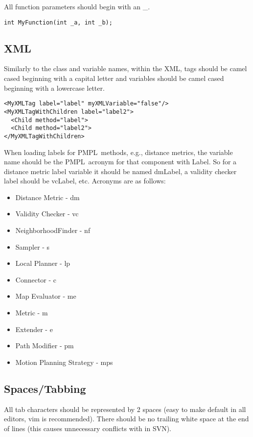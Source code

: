\documentclass[12pt]{article}
\newcommand{\pmpl}{PMPL}
\begin{document}
All function parameters should begin with an \_.

\begin{lstlisting}
int MyFunction(int _a, int _b);
\end{lstlisting}

\subsection{XML}
Similarly to the class and variable names, within the XML, tags should be camel
cased beginning with a capital letter and variables should be camel cased
beginning with a lowercase letter.

\begin{lstlisting}
<MyXMLTag label="label" myXMLVariable="false"/>
<MyXMLTagWithChildren label="label2">
  <Child method="label">
  <Child method="label2">
</MyXMLTagWithChildren>
\end{lstlisting}

When loading labels for \pmpl\ methods, e.g., distance metrics, the variable
name should be the \pmpl\ acronym for that component with Label. So for a
distance metric label variable it should be named dmLabel, a validity checker
label should be vcLabel, etc. Acronyms are as follows:

\begin{itemize}
  \item Distance Metric - dm
  \item Validity Checker - vc
  \item NeighborhoodFinder - nf
  \item Sampler - s
  \item Local Planner - lp
  \item Connector - c
  \item Map Evaluator - me
  \item Metric - m
  \item Extender - e
  \item Path Modifier - pm
  \item Motion Planning Strategy - mps
\end{itemize}

\subsection{Spaces/Tabbing}
All tab characters should be represented by 2 spaces (easy to make default in
all editors, vim is recommended). There should be no trailing white space at the
end of lines (this causes unnecessary conflicts with in SVN).
\end{document}
